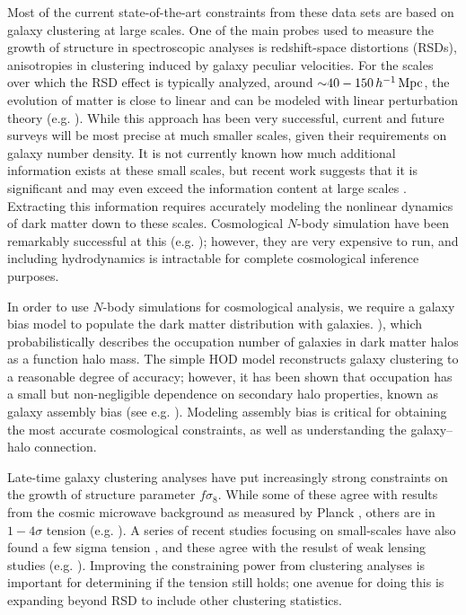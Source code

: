 Most of the current state-of-the-art constraints from these data sets are based on galaxy clustering at large scales.
One of the main probes used to measure the growth of structure in spectroscopic analyses is redshift-space distortions (RSDs), anisotropies in clustering induced by galaxy peculiar velocities.
For the scales over which the RSD effect is typically analyzed, around $\mathord{\sim}40-150 \, h^{-1}\,\mathrm{Mpc}$, the evolution of matter is close to linear and can be modeled with linear perturbation theory (e.g. \citealt{Alam2017}).
While this approach has been very successful, current and future surveys will be most precise at much smaller scales, given their requirements on galaxy number density.
It is not currently known how much additional information exists at these small scales, but recent work suggests that it is significant and may even exceed the information content at large scales \citep{Zhai2019}.
Extracting this information requires accurately modeling the nonlinear dynamics of dark matter down to these scales.
Cosmological $N$-body simulation have been remarkably successful at this (e.g. \citealt{Klypin2011}); however, they are very expensive to run, and including hydrodynamics is intractable for complete cosmological inference purposes.

In order to use $N$-body simulations for cosmological analysis, we require a galaxy bias model to populate the dark matter distribution with galaxies.
\citealt{Seljak2000, BerlindWeinberg2002, CooraySheth2002, Zheng2005}), which probabilistically describes the occupation number of galaxies in dark matter halos as a function halo mass.
The simple HOD model reconstructs galaxy clustering to a reasonable degree of accuracy; however, it has been shown that occupation has a small but non-negligible dependence on secondary halo properties, known as galaxy assembly bias (see e.g. \citealt{Wechsler2006, Croton2007, Zentner2014, WechslerTinker2018}).
Modeling assembly bias is critical for obtaining the most accurate cosmological constraints, as well as understanding the galaxy--halo connection.

Late-time galaxy clustering analyses have put increasingly strong constraints on the growth of structure parameter $f \sigma_8$.
While some of these agree with results from the cosmic microwave background as measured by Planck \citep{eboss_collaboration_completed_2021,zhang_boss_2022}, others are in $1-4 \sigma$ tension (e.g. \citealt{Macaulay2013, Sanchez2014, deMattia2021}).
A series of recent studies focusing on small-scales have also found a few sigma tension \citep{Chapman2021, Lange2022, Zhai2022, Yuan2022}, and these agree with the resulst of weak lensing studies (e.g. \citealt{MacCrann2015, Leauthaud2017, joudaki_kidsviking-450_2020}).
Improving the constraining power from clustering analyses is important for determining if the tension still holds; one avenue for doing this is expanding beyond RSD to include other clustering statistics.

